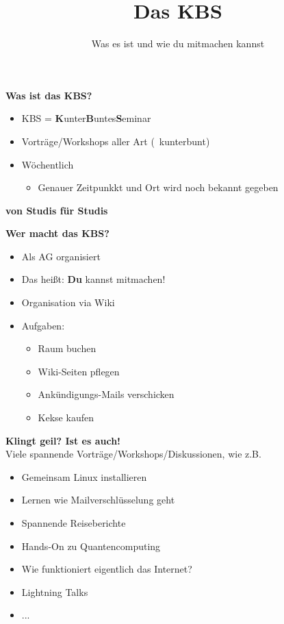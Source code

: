 \documentclass[t]{beamer}
\title{Das KBS}
\subtitle{Was es ist und wie du mitmachen kannst}
\date{}
\newcommand{\heading}[1]{{\Large\bfseries\vspace{1cm}\textcolor{darkerBlue}{#1}\\\vspace{0.65cm}}}
\begin{document}
	{
		\vspace*{-0.65cm}
		\maketitle
		\addtocounter{page}{-1}
	}
	
	\begin{frame}[plain]
		\heading{Was ist das KBS?}
		\begin{itemize}
			\item KBS = \textbf{K}unter\textbf{B}untes\textbf{S}eminar
			\item Vorträge/Workshops aller Art (\textrightarrow\ kunterbunt)
			\item Wöchentlich
			\begin{itemize}
				\item Genauer Zeitpunkkt und Ort wird noch bekannt gegeben
			\end{itemize}
		\end{itemize}
		\vspace{1cm}
		\pause
		\begin{center}
			\textbf{von Studis für Studis}
		\end{center}
	\end{frame}
	
	\begin{frame}[plain]
		\heading{Wer macht das KBS?}
		\begin{itemize}
			\item Als AG organisiert
			\item Das heißt: \textbf{Du} kannst mitmachen!
			\item Organisation via Wiki
			\item Aufgaben:
			\begin{itemize}
				\item Raum buchen
				\item Wiki-Seiten pflegen
				\item Ankündigungs-Mails verschicken
				\item Kekse kaufen
			\end{itemize}
		\end{itemize}
	\end{frame}
	
	\begin{frame}[plain]
		\heading{Klingt geil? Ist es auch!}
		Viele spannende Vorträge/Workshops/Diskussionen, wie z.B.
		\begin{itemize}
			\item Gemeinsam Linux installieren
			\item Lernen wie Mailverschlüsselung geht
			\item Spannende Reiseberichte
			\item Hands-On zu Quantencomputing
			\item Wie funktioniert eigentlich das Internet?
			\item Lightning Talks
			\item ...
		\end{itemize}
	\end{frame}
	
\end{document}
